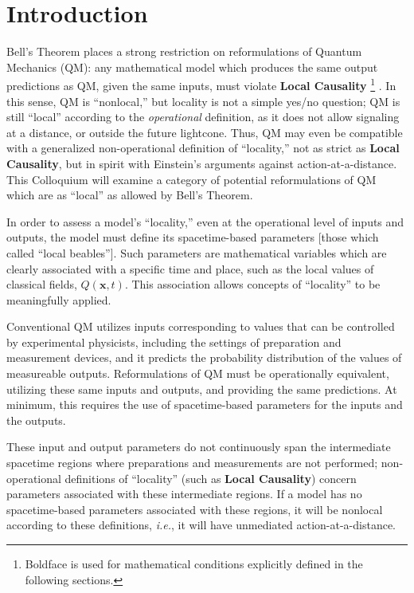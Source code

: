 \documentclass[rmp, aps, preprint, longbibliography]{revtex4-1}
\begin{document}
\tableofcontents

\newpage
{}

\section{Introduction}

Bell's Theorem places a strong restriction on reformulations of Quantum Mechanics (QM): any mathematical model which produces the same output predictions as QM, given the same inputs, must violate {\bf Local Causality}%
\footnote{Boldface is used for mathematical conditions explicitly defined in the following sections.} \cite{bell1964}.
In this sense, QM is ``nonlocal,'' but locality is not a simple yes/no question; QM is still ``local'' according to the \emph{operational} definition, as it does not allow signaling at a distance, or outside the future lightcone.  Thus, QM may even be compatible with a generalized non-operational definition of ``locality,'' not as strict as {\bf Local Causality}, but in spirit with Einstein's arguments against action-at-a-distance.  This Colloquium will examine a category of potential reformulations of QM which are as ``local'' as allowed by Bell's Theorem.

In order to assess a model's ``locality,'' even at the operational level of inputs and outputs, the model must define its spacetime-based parameters [those which \textcite{bell1976b} called ``local beables''].  Such parameters are mathematical variables which are clearly associated with a specific time and place, such as the local values of classical fields, $Q(\bm{x},t)$.  This association allows concepts of ``locality'' to be meaningfully applied.  

Conventional QM utilizes inputs corresponding to values that can be controlled by experimental physicists, including the settings of preparation and measurement devices, and it predicts the probability distribution of the values of measureable outputs.  Reformulations of QM must be operationally equivalent, utilizing these same inputs and outputs, and providing the same predictions.  At minimum, this requires the use of spacetime-based parameters for the inputs and the outputs.

These input and output parameters do not continuously span the intermediate spacetime regions where preparations and measurements are not performed; non-operational definitions of ``locality'' (such as {\bf Local Causality}) concern parameters associated with these intermediate regions.  If a model has no spacetime-based parameters associated with these regions, it will be nonlocal according to these definitions, \emph{i.e.}, it will have unmediated action-at-a-distance.
\end{document}

